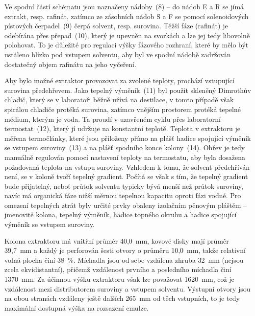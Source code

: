 Ve spodní částí schématu jsou naznačeny nádoby~(8) -- do nádob E a R se jímá extrakt, resp. rafinát, zatímco ze zásobních nádob S a F se pomocí solenoidových pístových čerpadel~(9) čerpá solvent, resp. surovina.
Těžší fáze (rafinát) je odebírána přes přepad~(10), který je upevněn na svorkách a lze jej tedy libovolně polohovat.
To je důležité pro regulaci výšky fázového rozhraní, které by mělo být ustáleno blízko pod vstupem solventu, aby byl ve spodní nádobě zadržován dostatečný objem rafinátu na jeho vyčeření.

Aby bylo možné extraktor provozovat za zvolené teploty, prochází vstupující surovina předehřevem.
Jako tepelný výměník~(11) byl použit skleněný Dimrothův chladič, který se v laboratoři běžně užívá na destilace, v tomto případě však spirálou chladiče protéká surovina, zatímco vnějším prostorem protéká tepelné médium, kterým je voda.
Ta proudí v uzavřeném cyklu přes laboratorní termostat~(12), který jí udržuje na konstantní teplotě.
Teplota v extraktoru je měřena termočlánky, které jsou přiloženy přímo na plášť hadice spojující výměník se vstupem suroviny~(13) a na plášť spodního konce kolony~(14).
Ohřev je tedy manuálně regulován pomocí nastavení teploty na termostatu, aby byla dosažena požadovaná teplota na vstupu suroviny.
Vzhledem k tomu, že solvent předehříván není, se v koloně tvoří tepelný gradient.
Počítá se však s tím, že tepelný gradient bude přijatelný, neboť průtok solventu typicky bývá menší než průtok suroviny, navíc má organická fáze nižší měrnou tepelnou kapacitu oproti fázi vodné.
Pro omezení tepelných ztrát byly určité prvky obaleny izolačním pěnovým pláštěm -- jmenovitě kolona, tepelný výměník, hadice topného okruhu a hadice spojující výměník se vstupem suroviny.

Kolona extraktoru má vnitřní průměr 40,0~mm, kovové disky mají průměr 39,7~mm a každý je perforován šesti otvory o průměru 10,0~mm, takže relativní volná plocha činí 38~\%.
Míchadla jsou od sebe vzdálena zhruba 32~mm (nejsou zcela ekvidistantní), přičemž vzdálenost prvního a posledního míchadla činí 1370~mm.
Za účinnou výšku extraktoru však lze považovat 1620~mm, což je vzdálenost mezi distributorem suroviny a vstupem solventu.
Výstupní otvory jsou na obou stranách vzdáleny ještě dalších 265~mm od těch vstupních, to je tedy maximální dostupná výška na rozsazení emulze.

